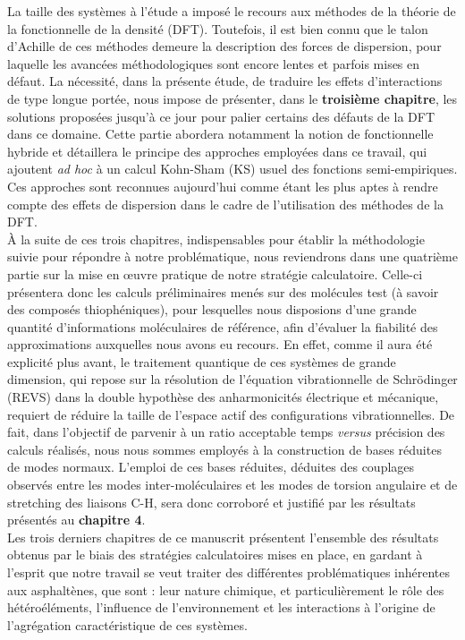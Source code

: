	La taille des systèmes à l'étude a imposé le recours aux méthodes de la théorie de la fonctionnelle de la densité (DFT). Toutefois, il est bien connu que le talon d'Achille de ces méthodes demeure la description des forces de dispersion, pour laquelle les avancées méthodologiques sont encore lentes et parfois mises en défaut. La nécessité, dans la présente étude, de traduire les effets d'interactions de type longue portée, nous impose de présenter, dans le \textbf{troisième chapitre}, les solutions proposées jusqu'à ce jour pour palier certains des défauts de la DFT dans ce domaine. Cette partie abordera notamment la notion de fonctionnelle hybride et détaillera le principe des approches employées dans ce travail, qui ajoutent \textit{ad hoc} à un calcul Kohn-Sham (KS) usuel des fonctions semi-empiriques. Ces approches sont reconnues aujourd'hui comme étant les plus aptes à rendre compte des effets de dispersion dans le cadre de l'utilisation des méthodes de la DFT. \\
	
	À la suite de ces trois chapitres, indispensables pour établir la méthodologie suivie pour répondre à notre problématique, nous reviendrons dans une quatrième partie sur la mise en œuvre pratique de notre stratégie calculatoire. Celle-ci présentera donc les calculs préliminaires menés sur des molécules test (à savoir des composés thiophéniques), pour lesquelles nous disposions d'une grande quantité d'informations moléculaires de référence, afin d'évaluer la fiabilité des approximations auxquelles nous avons eu recours. En effet, comme il aura été explicité plus avant, le traitement quantique de ces systèmes de grande dimension, qui repose sur la résolution de l'équation vibrationnelle de Schrödinger (REVS) dans la double hypothèse des anharmonicités électrique et mécanique, requiert de réduire la taille de l'espace actif des configurations vibrationnelles. De fait, dans l'objectif de parvenir à un ratio acceptable temps \textit{versus} précision des calculs réalisés, nous nous sommes employés à la construction de bases réduites de modes normaux. L'emploi de ces bases réduites, déduites des couplages observés entre les modes inter-moléculaires et les modes de torsion angulaire et de stretching des liaisons C-H, sera donc corroboré et justifié par les résultats présentés au \textbf{chapitre 4}.  \\
	
	Les trois derniers chapitres de ce manuscrit présentent l'ensemble des résultats obtenus par le biais des stratégies calculatoires mises en place, en gardant à l'esprit que notre travail se veut traiter des différentes problématiques inhérentes aux asphaltènes, que sont : leur nature chimique, et particulièrement le rôle des hétéroéléments, l'influence de l'environnement et les interactions à l'origine de l'agrégation caractéristique de ces systèmes.\\ 
	
